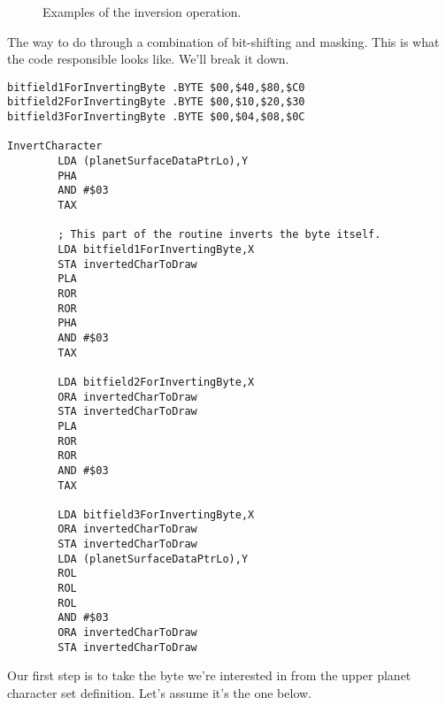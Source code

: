 \begin{figure}[H]
{\begin{adjustbox}{width=10cm,center}
    \end{adjustbox}
  }\caption{Examples of the inversion operation.}
\end{figure}

The way to do through a combination of bit-shifting and masking. This is what the code
responsible looks like. We'll break it down.

\begin{lstlisting}[caption=\icode{InvertSurfaceDataForLowerPlanet}.]
bitfield1ForInvertingByte .BYTE $00,$40,$80,$C0
bitfield2ForInvertingByte .BYTE $00,$10,$20,$30
bitfield3ForInvertingByte .BYTE $00,$04,$08,$0C

InvertCharacter
        LDA (planetSurfaceDataPtrLo),Y
        PHA
        AND #$03
        TAX

        ; This part of the routine inverts the byte itself.
        LDA bitfield1ForInvertingByte,X
        STA invertedCharToDraw
        PLA
        ROR
        ROR
        PHA
        AND #$03
        TAX

        LDA bitfield2ForInvertingByte,X
        ORA invertedCharToDraw
        STA invertedCharToDraw
        PLA
        ROR
        ROR
        AND #$03
        TAX

        LDA bitfield3ForInvertingByte,X
        ORA invertedCharToDraw
        STA invertedCharToDraw
        LDA (planetSurfaceDataPtrLo),Y
        ROL
        ROL
        ROL
        AND #$03
        ORA invertedCharToDraw
        STA invertedCharToDraw
\end{lstlisting}

Our first step is to take the byte we're interested in from the upper planet character set
definition. Let's assume it's the one below.

